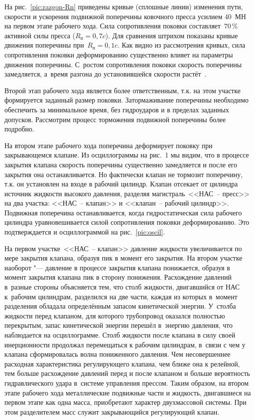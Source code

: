 На рис.~\ref{pic:razgon-Rn} приведены кривые (сплошные линии) изменения пути, скорости и ускорения подвижной поперечины ковочного пресса усилием 40~МН на первом этапе рабочего хода. 
Сила сопротивления поковки составляет~$ 70\,\% $ активной силы пресса ($ R_\text{п}=0,7c$). 
Для сравнения штрихом показаны кривые движения поперечины при~$ R_\text{п}=0,1c$. 
Как видно из рассмотрения кривых, сила сопротивления поковки деформированию существенно влияет на параметры движения поперечины. С~ростом сопротивления поковки скорость поперечины замедляется, а~время разгона до установившейся скорости растёт~\cite{bib:KShP}.

\smallskip
{}
Второй этап рабочего хода является более ответственным, т.к. на этом участке формируется заданный размер поковки. 
Затормаживание поперечины необходимо обеспечить за минимальное время, без гидроударов и в пределах заданных допусков. 
Рассмотрим процесс торможения подвижной поперечины более подробно.

На втором этапе рабочего хода поперечина деформирует поковку при закрывающемся клапане. 
Из осциллограммы на рис.~1 мы видим, что в процессе закрытия клапана скорость поперечины существенно замедляется и после его закрытия она останавливается. 
Но фактически клапан не тормозит поперечину, т.к. он установлен на входе в рабочий цилиндр. 
Клапан отсекает от цилиндра источник жидкости высокого давления, разделяя магистраль~<<НАС~-- пресс>> на два участка: <<НАС~-- клапан>> и <<клапан~-- рабочий цилиндр>>. 
Подвижная поперечина останавливается, когда гидростатическая сила рабочего цилиндра уравновешивается силой сопротивления поковки деформированию. 
Это подтверждается и осциллограммой на рис.~\ref{pic:oscil}.

На первом участке~<<НАС~-- клапан>> давление жидкости увеличивается по мере закрытия клапана, образуя пик в момент его закрытия. 
На втором участке наоборот "--- давление в процессе закрытия клапана понижается, образуя в момент закрытия клапана пик в сторону понижения. 
Расхождение давлений в~разные стороны объясняется тем, что столб жидкости, двигавшийся от НАС к~рабочим цилиндрам, разделился на две части, каждая из которых в~момент разделения обладала определённым запасом кинетической энергии. 
У~столба жидкости перед клапаном, для которого трубопровод оказался полностью перекрытым, запас кинетической энергии перешёл в~энергию давления, что наблюдается на осциллограмме. 
Столб жидкости после клапана в силу своей инерционности продолжал перемещаться к рабочим цилиндрам, в~связи с чем у клапана сформировалась волна пониженного давления. 
Чем несовершеннее расходная характеристика регулирующего клапана, чем ближе она к релейной, тем больше расхождение давлений перед и после клапаном и больше вероятность гидравлического удара в~системе управления прессом. 
Таким образом, на втором этапе рабочего хода металлические подвижные части и жидкость, двигавшиеся на первом этапе как одна масса, приобретают характер двухмассовой системы. 
При этом разделителем масс служит закрывающийся регулирующий клапан.

